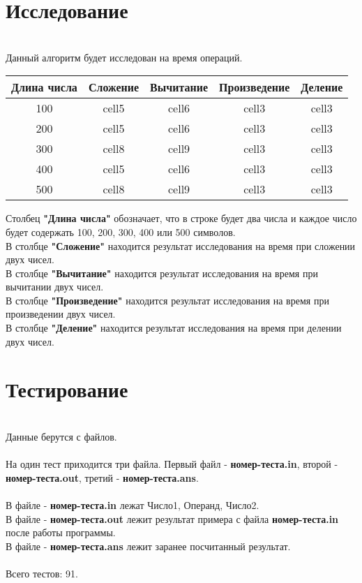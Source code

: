 \documentclass[a4paper]{article}
\begin{document}
\section{Исследование}
\\Данный алгоритм будет исследован на время операций.
\\
\begin{center}
\begin{tabular}{ |c|c|c|c|c|}
\hline
Длина числа & Сложение & Вычитание & Произведение & Деление \\ 
\hline
100 & cell5 & cell6 & cell3 & cell3 \\  
200 & cell5 & cell6 & cell3 & cell3 \\  
300 & cell8 & cell9 & cell3 & cell3 \\
400 & cell5 & cell6 & cell3 & cell3 \\  
500 & cell8 & cell9 & cell3 & cell3 \\
\hline
\end{tabular}
\end{center}
Столбец \textbf{"Длина числа"} обозначает, что в строке будет два числа и каждое число будет содержать 100, 200, 300, 400 или 500 символов.
\\В столбце \textbf{"Сложение"} находится результат исследования на время при сложении двух чисел.
\\В столбце \textbf{"Вычитание"} находится результат исследования на время при вычитании двух чисел.
\\В столбце \textbf{"Произведение"} находится результат исследования на время при произведении двух чисел.
\\В столбце \textbf{"Деление"} находится результат исследования на время при делении двух чисел.
\newpage

\section{Тестирование}
\\Данные берутся с файлов.
\\
\\На один тест приходится три файла. Первый файл - \textbf{номер-теста.in}, второй - \textbf{номер-теста.out}, третий - \textbf{номер-теста.ans}.
\\
\\В файле - \textbf{номер-теста.in} лежат Число1, Операнд, Число2.
\\В файле - \textbf{номер-теста.out} лежит результат примера с файла \textbf{номер-теста.in} после работы программы.
\\В файле - \textbf{номер-теста.ans} лежит заранее посчитанный результат.
\\
\\Всего тестов: 91.
\newpage
\end{document}
